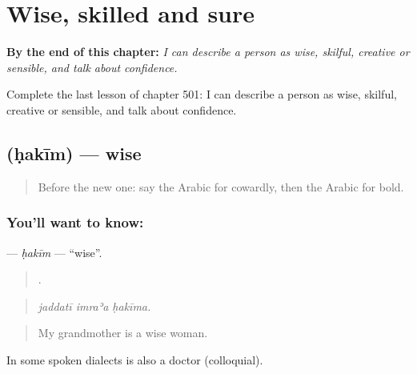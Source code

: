 
\chapter{Wise, skilled and sure}
\label{ch:ar-wise-skilled-and-sure}

\begin{chapteropening}
\textbf{By the end of this chapter:} \emph{I can describe a person as wise, skilful, creative or sensible, and talk about confidence.}

Complete the last lesson of chapter 501: I can describe a person as wise, skilful, creative or sensible, and talk about confidence.
\end{chapteropening}

\section[\texorpdfstring{\ar{حكيم} (ḥakīm)}{حكيم (ḥakīm)}]{ (ḥakīm) — wise}

\label{lesson:AR-C501-hakim}



\begin{quote}
Before the new one: say the Arabic for cowardly, then the Arabic for bold.
\end{quote}

\subsection*{You'll want to know: }
\textbf{} — \emph{ḥakīm} — \textquotedblleft{}wise\textquotedblright{}.

\begin{quote}
  .
\end{quote}

\begin{quote}
\emph{jaddatī imraʾa ḥakīma.}
\end{quote}

\begin{quote}
My grandmother is a wise woman.
\end{quote}

In some spoken dialects  is also a doctor (colloquial).

